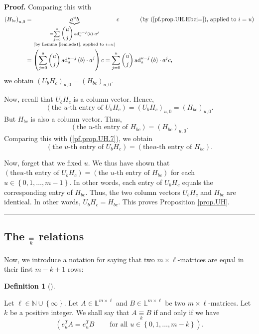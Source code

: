 \documentclass[numbers=enddot,12pt,final,onecolumn,notitlepage]{scrartcl}%
\theoremstyle{definition}
\newtheorem{defi}[theo]{Definition}
\newenvironment{definition}[1][]
{\begin{defi}[#1]\begin{leftbar}}
{\end{leftbar}\end{defi}}
\newenvironment{proof}[1][Proof]{\noindent\textbf{#1.} }{\ \rule{0.5em}{0.5em}}
\let\sumnonlimits\sum
\renewcommand{\sum}{\sumnonlimits\limits}
\begin{document}
\begin{proof}
Comparing this with%
\begin{align*}
\left(  H_{bc}\right)  _{u,0}  &  =\underbrace{a^{u}b}_{\substack{=\sum
_{j=0}^{u}\dbinom{u}{j}\operatorname*{ad}\nolimits_{a}^{u-j}\left(  b\right)
\cdot a^{j}\\\text{(by Lemma \ref{lem.ada1}, applied to }i=u\text{)}%
}}c\ \ \ \ \ \ \ \ \ \ \left(  \text{by (\ref{pf.prop.UH.Hbci=}), applied to
}i=u\right) \\
&  =\left(  \sum_{j=0}^{u}\dbinom{u}{j}\operatorname*{ad}\nolimits_{a}%
^{u-j}\left(  b\right)  \cdot a^{j}\right)  c=\sum_{j=0}^{u}\dbinom{u}%
{j}\operatorname*{ad}\nolimits_{a}^{u-j}\left(  b\right)  \cdot a^{j}c,
\end{align*}
we obtain $\left(  U_{b}H_{c}\right)  _{u,0}=\left(  H_{bc}\right)  _{u,0}$.

Now, recall that $U_{b}H_{c}$ is a column vector. Hence,%
\begin{equation}
\left(  \text{the }u\text{-th entry of }U_{b}H_{c}\right)  =\left(  U_{b}%
H_{c}\right)  _{u,0}=\left(  H_{bc}\right)  _{u,0}. \label{pf.prop.UH.7}%
\end{equation}
But $H_{bc}$ is also a column vector. Thus,%
\[
\left(  \text{the }u\text{-th entry of }H_{bc}\right)  =\left(  H_{bc}\right)
_{u,0}.
\]
Comparing this with (\ref{pf.prop.UH.7}), we obtain%
\[
\left(  \text{the }u\text{-th entry of }U_{b}H_{c}\right)  =\left(  \text{the
}u\text{-th entry of }H_{bc}\right)  .
\]


Now, forget that we fixed $u$. We thus have shown that $\left(  \text{the
}u\text{-th entry of }U_{b}H_{c}\right)  =\left(  \text{the }u\text{-th entry
of }H_{bc}\right)  $ for each $u\in\left\{  0,1,\ldots,m-1\right\}  $. In
other words, each entry of $U_{b}H_{c}$ equals the corresponding entry of
$H_{bc}$. Thus, the two column vectors $U_{b}H_{c}$ and $H_{bc}$ are
identical. In other words, $U_{b}H_{c}=H_{bc}$. This proves Proposition
\ref{prop.UH}.
\end{proof}

\subsection{The $\protect\underset{k}{\equiv}$ relations}

Now, we introduce a notation for saying that two $m\times\ell$-matrices are
equal in their first $m-k+1$ rows:

\begin{definition}
\label{def.equivk}Let $\ell\in\mathbb{N}\cup\left\{  \infty\right\}  $. Let
$A\in\mathbb{L}^{m\times\ell}$ and $B\in\mathbb{L}^{m\times\ell}$ be two
$m\times\ell$-matrices. Let $k$ be a positive integer. We shall say that
$A\underset{k}{\equiv}B$ if and only if we have%
\[
\left(  e_{u}^{T}A=e_{u}^{T}B\ \ \ \ \ \ \ \ \ \ \text{for all }u\in\left\{
0,1,\ldots,m-k\right\}  \right)  .
\]

\end{definition}
\end{document}
